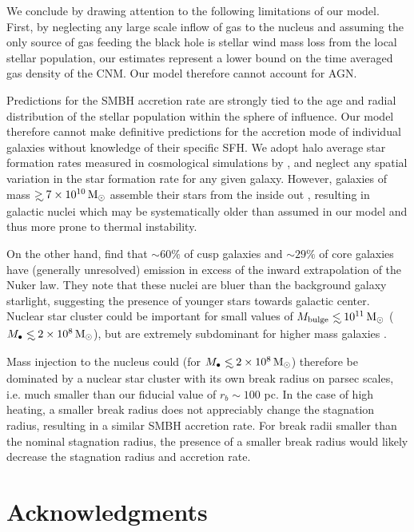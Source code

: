 \documentclass[usenatbib,fleqn]{mn2e}
\newcommand\lsim{\mathrel{\rlap{\lower4pt\hbox{\hskip1pt$\sim$}}
    \raise1pt\hbox{$<$}}}
\newcommand\gsim{\mathrel{\rlap{\lower4pt\hbox{\hskip1pt$\sim$}}
    \raise1pt\hbox{$>$}}}
\newcommand{\Mbh}[1][]{M_{\bullet#1}}
\begin{document}
We conclude by drawing attention to the following limitations of our
model.  First, by neglecting any large scale inflow of gas to the
nucleus and assuming the only source of gas feeding the black hole is
stellar wind mass loss from the local stellar population, our
estimates represent a lower bound on the time averaged gas density of
the CNM.  Our model therefore cannot account for AGN.

Predictions for the SMBH accretion rate are strongly tied to the age
and radial distribution of the stellar population within the sphere of
influence.  Our model therefore cannot make definitive predictions for
the accretion mode of individual galaxies without knowledge of their
specific SFH.  We adopt halo average star formation rates measured in
cosmological simulations by \citet{MosterNaab+:2013a}, and neglect any
spatial variation in the star formation rate for any given
galaxy. However, galaxies of mass $\gsim 7\times 10^{10} \Msun$
assemble their stars from the inside out
\citep{PerezCidFernandes+:2013a}, resulting in galactic nuclei which
may be systematically older than assumed in our model and thus more
prone to thermal instability.

On the other hand, \citealt{LauerFaber+:2005a} find that $\sim 60\%$
of cusp galaxies and $\sim29\%$ of core galaxies have (generally
unresolved) emission in excess of the inward extrapolation of the
Nuker law.  They note that these nuclei are bluer than the background
galaxy starlight, suggesting the presence of younger stars towards
galactic center. Nuclear star cluster could be important for small
values of $M_{\rm bulge}\lsim 10^{11} \Msun$ ($\Mbh\lsim 2\times 10^8
\Msun$), but are extremely subdominant for higher mass galaxies
\citep{GrahamSpitler:2009a}.

Mass injection to the nucleus could (for $\Mbh\lsim 2 \times 10^{8}
\Msun$) therefore be dominated by a nuclear star cluster with its own
break radius on parsec scales, i.e. much smaller than our fiducial
value of $r_b \sim 100$ pc.  In the case of high heating, a smaller
break radius does not appreciably change the stagnation radius,
resulting in a similar SMBH accretion rate.  For break radii smaller
than the nominal stagnation radius, the presence of a smaller break
radius would likely decrease the stagnation radius and accretion rate.

    

\section*{Acknowledgments}
\end{document}
